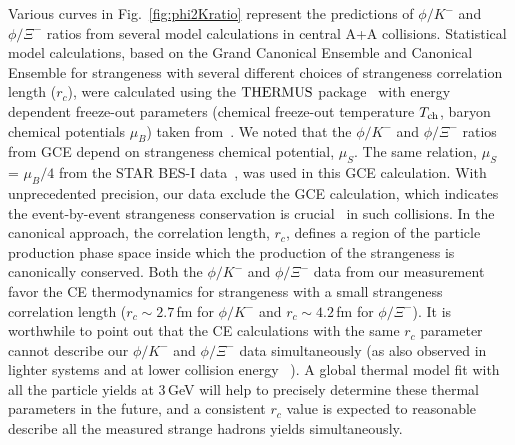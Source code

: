 \documentclass[aps,tightenlines,superscriptaddress,twocolumn]{revtex4-1}
\begin{document}
Various curves in Fig.~\ref{fig:phi2Kratio} represent the predictions of $\phi/K^-$ and $\phi/\Xi^-$ ratios from several model calculations in central A+A collisions. Statistical model calculations, based on the Grand Canonical Ensemble and Canonical Ensemble for strangeness with several different choices of strangeness correlation length ($r_c$), were calculated using the $\textup{THERMUS}$ package~\cite{THERMUS_WHEATON200984} with energy dependent freeze-out parameters (chemical freeze-out temperature $T_{\rm ch}$, baryon chemical potentials $\mu_B$) taken from~\cite{Andronic_2018Naure}. 
We noted that the $\phi/K^-$ and $\phi/\Xi^-$ ratios from GCE depend on strangeness chemical potential, $\mu_{S}$. The same relation, $\mu_{S}$ = $\mu_{B}/4$ from the STAR BES-I data~\cite{star_bes_strangeness:2020}, was used in this GCE calculation. 
With unprecedented precision, our data exclude the GCE calculation, 
which indicates the event-by-event strangeness conservation 
is crucial~\cite{BraunMunzinger:2003zd} in such collisions. In the canonical approach, the correlation length, $r_c$, defines a region of the particle production phase space inside which the production of the strangeness is canonically conserved. Both the $\phi/K^-$ and $\phi/\Xi^-$ data from our measurement favor the CE thermodynamics for strangeness with a small strangeness correlation length ($r_c \sim 2.7$\,fm for $\phi/K^-$ and $r_c \sim 4.2$\,fm for $\phi/\Xi^-$). It is worthwhile to point out that the CE calculations with the same $r_c$ parameter cannot describe our $\phi/K^-$ and $\phi/\Xi^-$ data simultaneously (as also observed in lighter systems and at lower collision energy ~\cite{HADES_phi_ArKCl:2009,Xi_ArKCl_HADES:2009}). 
A global thermal model fit with all the particle yields at 3\,GeV will help to precisely determine these thermal parameters in the future, and a consistent $r_c$ value is expected to reasonable describe all the measured strange hadrons yields simultaneously. 
\end{document}
